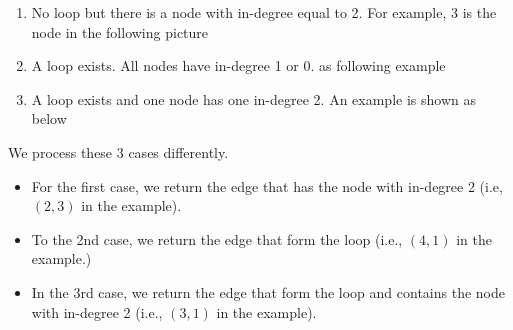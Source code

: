 \begin{enumerate}
\item No loop but there is a node with in-degree equal to 2. For example, 3 is the node in the following picture
\begin{figure}[H]
\end{figure}
\item A loop exists. All nodes have in-degree 1 or 0. as following example

\begin{figure}[H]
\end{figure}

\item A loop exists and one node has one in-degree 2. An example is shown as below

\begin{figure}[H]
\end{figure}

\end{enumerate}

We process these 3 cases differently. 

\begin{itemize}
\item For the first case, we return the edge that has the node with in-degree 2 (i.e, $(2,3)$ in the example). 

\item To the 2nd case, we return the edge that form the loop (i.e., $(4,1)$ in the example.)

\item In the 3rd case, we return the edge that form the loop and contains the node with in-degree 2 (i.e., $(3,1)$ in the example).
\end{itemize}


